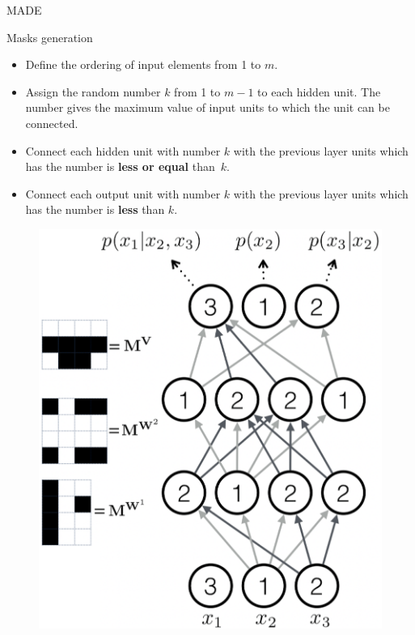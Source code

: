 \documentclass{beamer}
\begin{document}
\begin{frame}{MADE}
		\begin{minipage}[t]{0.65\columnwidth}
		    \vspace{-0.5cm}
			\begin{block}{Masks generation}
				\begin{itemize}
					\item Define the ordering of input elements from 1 to $m$.
					\item Assign the random number $k$ from 1 to $m - 1$ to each hidden unit. The number gives the
					maximum value of input units to which the unit can be connected.
					\item Connect each hidden unit with number $k$ with the previous layer units which has the number is \textbf{less or equal} than~$k$.
					\item Connect each output unit with number $k$ with the previous layer units which has the number is \textbf{less} than $k$.
				\end{itemize}
			\end{block}
		\end{minipage}%
		\begin{minipage}[t]{0.33\columnwidth}
			\vspace{2cm}
			\begin{figure}
				\centering
				\includegraphics[width=1.0\linewidth]{figs/made2}
			\end{figure}
		\end{minipage}
\end{frame}
\end{document}

